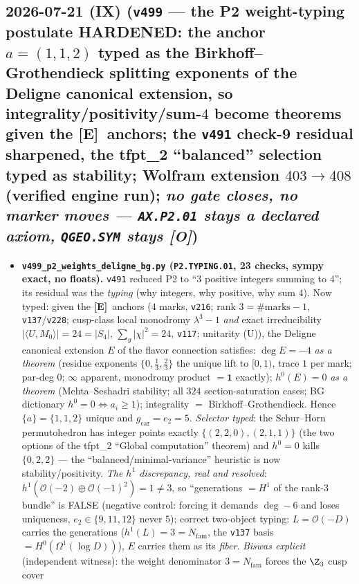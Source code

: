 \documentclass[11pt]{article}
\providecommand{\mE}{\textbf{[E]}}\providecommand{\mC}{\textbf{[C]}}
\providecommand{\mO}{\textbf{[O]}}\providecommand{\mX}{\textbf{[X]}}
\providecommand{\gcar}{g_{\mathrm{car}}}\providecommand{\Nfam}{N_{\mathrm{fam}}}
\begin{document}
\subsection*{2026-07-21 (IX) (\texttt{v499} --- the P2 weight-typing postulate HARDENED: the anchor $a=(1,1,2)$ typed as the Birkhoff--Grothendieck splitting exponents of the Deligne canonical extension, so integrality/positivity/sum-$4$ become theorems given the \mE\ anchors; the \texttt{v491} check-9 residual sharpened, the tfpt\_2 ``balanced'' selection typed as stability; Wolfram extension $403\to408$ (verified engine run); \emph{no gate closes, no marker moves --- \texttt{AX.P2.01} stays a declared axiom, \texttt{QGEO.SYM} stays \mO})}
\begin{itemize}[leftmargin=1.5em]
\item \textbf{\texttt{v499\_p2\_weights\_deligne\_bg.py} (\texttt{P2.TYPING.01}, 23 checks, sympy exact,
no floats).} \texttt{v491} reduced P2 to ``$3$ positive integers summing to $4$''; its residual was the
\emph{typing} (why integers, why positive, why sum $4$). Now typed: given the \mE\ anchors ($4$ marks,
\texttt{v216}; rank $3=\#\text{marks}-1$, \texttt{v137}/\texttt{v228}; cusp-class local monodromy
$\lambda^3-1$ \emph{and} exact irreducibility $|\langle U,M_0\rangle|=24=|S_4|$, $\sum_g|\chi|^2=24$,
\texttt{v117}; unitarity (U)), the Deligne canonical extension $E$ of the flavor connection satisfies:
$\deg E=-4$ \emph{as a theorem} (residue exponents $\{0,\tfrac13,\tfrac23\}$ the unique lift to $[0,1)$,
trace $1$ per mark; par-deg $0$; $\infty$ apparent, monodromy product $=\mathbf1$ exactly);
$h^0(E)=0$ \emph{as a theorem} (Mehta--Seshadri stability; all $324$ section-saturation cases; BG
dictionary $h^0{=}0\Leftrightarrow a_i\ge1$); integrality $=$ Birkhoff--Grothendieck. Hence
$\{a\}=\{1,1,2\}$ unique and $\gcar=e_2=5$. \emph{Selector typed}: the Schur--Horn permutohedron has
integer points exactly $\{(2,2,0),(2,1,1)\}$ (the two options of the tfpt\_2 ``Global computation''
theorem) and $h^0{=}0$ kills $\{0,2,2\}$ --- the ``balanced/minimal-variance'' heuristic is now
stability/positivity. \emph{The $h^1$ discrepancy, real and resolved}: $h^1(\mathcal
O(-2){\oplus}\mathcal O(-1)^2)=1\neq3$, so ``generations $=H^1$ of the rank-$3$ bundle'' is FALSE
(negative control: forcing it demands $\deg-6$ and loses uniqueness, $e_2\in\{9,11,12\}$ never $5$);
correct two-object typing: $L=\mathcal O(-D)$ carries the generations ($h^1(L)=3=\Nfam$, the
\texttt{v137} basis $=H^0(\Omega^1(\log D))$), $E$ carries them as its \emph{fiber}. \emph{Biswas
explicit} (independent witness): the weight denominator $3=\Nfam$ forces the $\Z_3$ cusp cover

\end{itemize}
\end{document}

